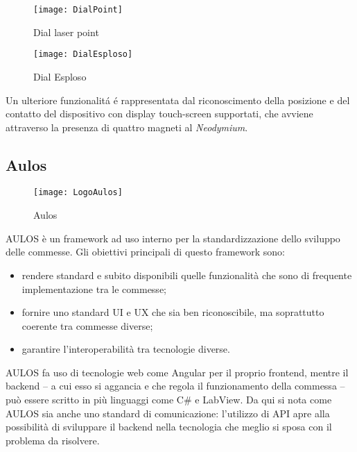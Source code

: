 \begin{figure}[htpb!]
	\begin{minipage}{0.35\textwidth}
		\centering
		\texttt{[image: DialPoint]}
		\caption{Dial laser point}
    \end{minipage}\hfill
    \begin{minipage}{0.65\textwidth}
		\centering
		\texttt{[image: DialEsploso]}
		\caption{Dial Esploso}
    \end{minipage}
\end{figure}

Un ulteriore funzionalitá é rappresentata dal riconoscimento della posizione e del contatto del dispositivo con display touch-screen supportati, che avviene attraverso la presenza di quattro magneti al \emph{Neodymium}. 

\newpage
\subsection{Aulos}
\begin{figure}[htpb!]
\center
  \texttt{[image: LogoAulos]}
  \caption{Aulos}
\end{figure}
AULOS è un framework ad uso interno per la standardizzazione dello sviluppo delle commesse.
Gli obiettivi principali di questo framework sono:
\begin{itemize}
\item rendere standard e subito disponibili quelle funzionalità che sono di frequente implementazione tra le commesse;
\item fornire uno standard UI e UX che sia ben riconoscibile, ma soprattutto coerente tra commesse diverse;
\item garantire l’interoperabilità tra tecnologie diverse.
\end{itemize}

AULOS fa uso di tecnologie web come Angular per il proprio frontend, mentre il backend – a cui esso si aggancia e che regola il funzionamento della commessa – può essere scritto in più linguaggi come C\# e LabView.
Da qui si nota come AULOS sia anche uno standard di comunicazione: l’utilizzo di API apre alla possibilità di sviluppare il backend nella tecnologia che meglio si sposa con il problema da risolvere.
